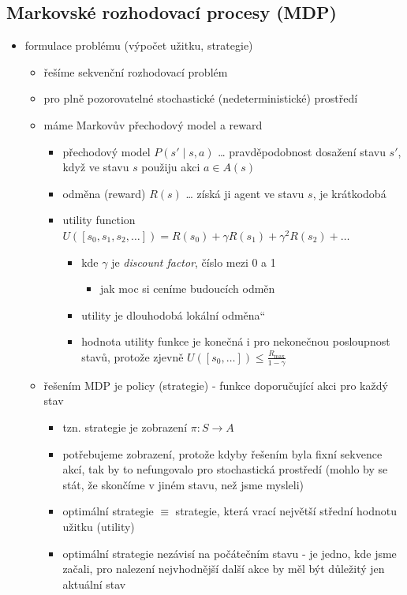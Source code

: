 \subsection{Markovské rozhodovací procesy (MDP)}
\begin{itemize}
\item formulace problému (výpočet užitku, strategie)
\begin{itemize}
\item řešíme sekvenční rozhodovací problém
\item pro plně pozorovatelné stochastické (nedeterministické) prostředí
\item máme Markovův přechodový model a reward
\begin{itemize}
\item přechodový model $P(s'\mid s,a)$ \dots{} pravděpodobnost dosažení stavu $s'$, když ve stavu $s$ použiju akci $a\in A(s)$
\item odměna (reward) $R(s)$ \dots{} získá ji agent ve stavu $s$, je krátkodobá
\item utility function $U([s_0,s_1,s_2,\dots])=R(s_0)+\gamma R(s_1)+\gamma^2 R(s_2)+\dots$
\begin{itemize}
\item kde $\gamma$ je \textit{discount factor}, číslo mezi 0 a 1
\begin{itemize}
\item jak moc si ceníme budoucích odměn
\end{itemize}
\item utility je \quotedblbase{}dlouhodobá lokální odměna\textquotedblleft{}
\item hodnota utility funkce je konečná i pro nekonečnou posloupnost stavů, protože zjevně $U([s_0,\dots])\leq \frac{R_\text{max}}{1-\gamma}$
\end{itemize}
\end{itemize}
\item řešením MDP je policy (strategie) - funkce doporučující akci pro každý stav
\begin{itemize}
\item tzn. strategie je zobrazení $\pi:S\to A$
\item potřebujeme zobrazení, protože kdyby řešením byla fixní sekvence akcí, tak by to nefungovalo pro stochastická prostředí (mohlo by se stát, že skončíme v jiném stavu, než jsme mysleli)
\item optimální strategie $\equiv$ strategie, která vrací největší střední hodnotu užitku (utility)
\item optimální strategie nezávisí na počátečním stavu - je jedno, kde jsme začali, pro nalezení nejvhodnější další akce by měl být důležitý jen aktuální stav

\end{itemize}
\end{itemize}
\end{itemize}
